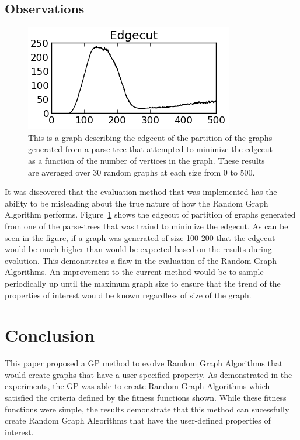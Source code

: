 \documentclass{article}
\begin{document}
\subsection{Observations}


\begin{figure}
\begin{centering}
  \includegraphics[scale=1]{mislead.png}
  \caption{This is a graph describing the edgecut of the partition of the graphs generated from a parse-tree that attempted to minimize the edgecut as a function of the number of vertices in the graph. 
    These results are averaged over 30 random graphs at each size from 0 to 500.}
  \label{fig:mislead}
\end{centering}
\end{figure}



It was discovered that the evaluation method that was implemented has the ability to be misleading about the true nature of how the
Random Graph Algorithm performs. Figure~\ref{fig:mislead} shows the edgecut of partition of graphs generated from one of the parse-trees
that was traind to minimize the edgecut. As can be seen in the figure, if a graph was generated of size 100-200 that the edgecut would be
much higher than would be expected based on the results during evolution. This demonstrates a flaw in the evaluation of the Random Graph Algorithms.
An improvement to the current method would be to sample periodically up until the maximum graph size to ensure that the trend of the
properties of interest would be known regardless of size of the graph.



\section{Conclusion}
This paper proposed a GP method to evolve Random Graph Algorithms that would create graphs that have a user specified property. As demonstrated
in the experiments, the GP was able to create Random Graph Algorithms which satisfied the criteria defined by the fitness functions shown. While these
fitness functions were simple, the results demonstrate that this method can sucessfully create Random Graph Algorithms that have the user-defined 
properties of interest. 
\end{document}
